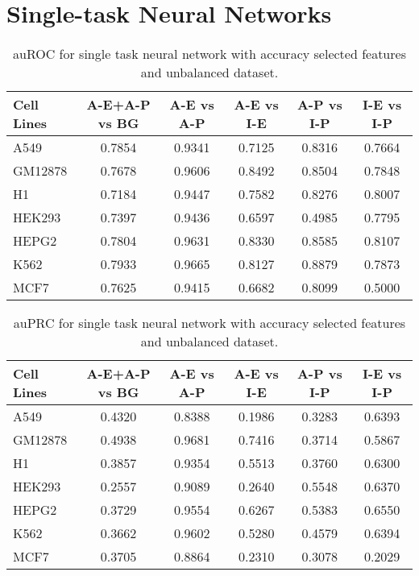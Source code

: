 \section{Single-task Neural Networks}
\begin{table}[!htbp]
\centering
\caption{auROC for single task neural network with accuracy selected features and unbalanced dataset.}
\label{tab:unbalanced_old_auroc}
\begin{tabular}[t]{l*{5}{c}}
\toprule
Cell Lines & A-E+A-P vs BG & A-E vs A-P & A-E vs I-E & A-P vs I-P & I-E vs I-P \\
\midrule
A549  & 0.7854 & 0.9341 & 0.7125 & 0.8316 & 0.7664\\
GM12878  & 0.7678 & 0.9606 & 0.8492 & 0.8504 & 0.7848\\
H1  & 0.7184 & 0.9447 & 0.7582 & 0.8276 & 0.8007\\
HEK293  & 0.7397 & 0.9436 & 0.6597 & 0.4985 & 0.7795\\
HEPG2  & 0.7804 & 0.9631 & 0.8330 & 0.8585 & 0.8107\\
K562  & 0.7933 & 0.9665 & 0.8127 & 0.8879 & 0.7873\\
MCF7  & 0.7625 & 0.9415 & 0.6682 & 0.8099 & 0.5000\\
\bottomrule
\end{tabular}
\end{table}

\begin{table}[!htbp]
\centering
\caption{auPRC for single task neural network with accuracy selected features and unbalanced dataset.}
\label{tab:unbalanced_old_auprc}
\begin{tabular}[t]{l*{5}{c}}
\toprule
Cell Lines & A-E+A-P vs BG & A-E vs A-P & A-E vs I-E & A-P vs I-P & I-E vs I-P \\
\midrule
A549  & 0.4320 & 0.8388 & 0.1986 & 0.3283 & 0.6393\\
GM12878  & 0.4938 & 0.9681 & 0.7416 & 0.3714 & 0.5867\\
H1  & 0.3857 & 0.9354 & 0.5513 & 0.3760 & 0.6300\\
HEK293  & 0.2557 & 0.9089 & 0.2640 & 0.5548 & 0.6370\\
HEPG2  & 0.3729 & 0.9554 & 0.6267 & 0.5383 & 0.6550\\
K562  & 0.3662 & 0.9602 & 0.5280 & 0.4579 & 0.6394\\
MCF7  & 0.3705 & 0.8864 & 0.2310 & 0.3078 & 0.2029\\
\bottomrule
\end{tabular}
\end{table}

